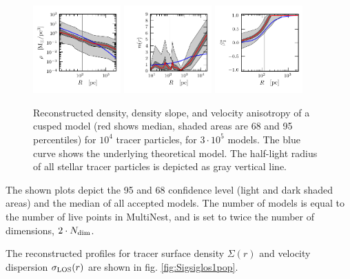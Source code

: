 \begin{figure}
    \begin{center}
        \hspace{-7mm}
        \includegraphics[width=0.3\textwidth]{fig/prof_1_pop_cusp/prof_rho_0.pdf}
        \includegraphics[width=0.3\textwidth]{fig/prof_1_pop_cusp/prof_nr_0.pdf}
        \includegraphics[width=0.3\textwidth]{fig/prof_1_pop_cusp/prof_betastar_1.png}
        \caption{Reconstructed density, density slope, and velocity
          anisotropy of a cusped model (red shows median, shaded areas
          are 68 and 95 percentiles) for $10^4$ tracer particles, for
          $3\cdot10^5$ models. The blue curve shows the underlying
          theoretical model. The half-light radius of all stellar
          tracer particles is depicted as gray vertical line.}
        \label{fig:cusp1pop}
    \end{center}
\end{figure}

The shown plots depict the 95 and 68 confidence level (light and dark
shaded areas) and the median of all accepted models. The number of
models is equal to the number of live points in MultiNest, and is set
to twice the number of dimensions, $2\cdot N_{\rm dim}$.

The reconstructed profiles for tracer surface density $\Sigma(r)$ and
velocity dispersion $\sigma_{\text{LOS}}(r)$ are shown in fig. \ref{fig:Sigsiglos1pop}.

